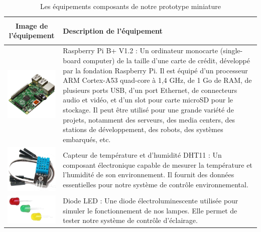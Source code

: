 \begin{table}[H]
\begin{center}
\begin{tabular}{|c{3cm}|l{10cm}|}
\hline
\textbf{Image de l'équipement} & \begin{center} \textbf{Description de l'équipement} \end{center} \\
\hline
\includegraphics[width=3cm]{Images/RaspberryPi3.png} & Raspberry Pi B+ V1.2 : Un ordinateur monocarte (single-board computer) de la taille d'une carte de crédit, développé par la fondation Raspberry Pi. Il est équipé d'un processeur ARM Cortex-A53 quad-core à 1,4 GHz, de 1 Go de RAM, de plusieurs ports USB, d'un port Ethernet, de connecteurs audio et vidéo, et d'un slot pour carte microSD pour le stockage. Il peut être utilisé pour une grande variété de projets, notamment des serveurs, des media centers, des stations de développement, des robots, des systèmes embarqués, etc. \\
\hline
\includegraphics[width=3cm]{Images/DHT11.png} & Capteur de température et d'humidité DHT11 : Un composant électronique capable de mesurer la température et l'humidité de son environnement. Il fournit des données essentielles pour notre système de contrôle environnemental. \\
\hline
\includegraphics[width=3cm]{Images/DiodeLED.png} & Diode LED : Une diode électroluminescente utilisée pour simuler le fonctionnement de nos lampes. Elle permet de tester notre système de contrôle d'éclairage. \\
\hline
\end{tabular}
\caption{Les équipements composants de notre prototype miniature}
\label{table:matériel-prototype}
\end{center}
\end{table}




